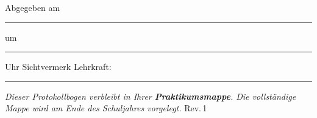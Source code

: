 \documentclass[11pt,a4paper]{scrartcl}
\begin{document}
	\vspace{0.4cm}
	\begin{tcolorbox}[colback=yellow!8, colframe=black, boxrule=0.6pt, title={\faIcon{check-circle}\enspace Abgabevermerk -- wird vor Ort ausgefüllt}, fonttitle=\bfseries]
		Abgegeben am \rule{2.8cm}{0.4pt} \enspace um \rule{2cm}{0.4pt} Uhr \hfill Sichtvermerk Lehrkraft: \rule{3.5cm}{0.4pt}

		\vspace{0.15cm}
		{\small\textit{Dieser Protokollbogen verbleibt in Ihrer \textbf{Praktikumsmappe}. Die vollständige Mappe wird am Ende des Schuljahres vorgelegt.} \hfill \scriptsize Rev.\,1}
	\end{tcolorbox}
\end{document}
